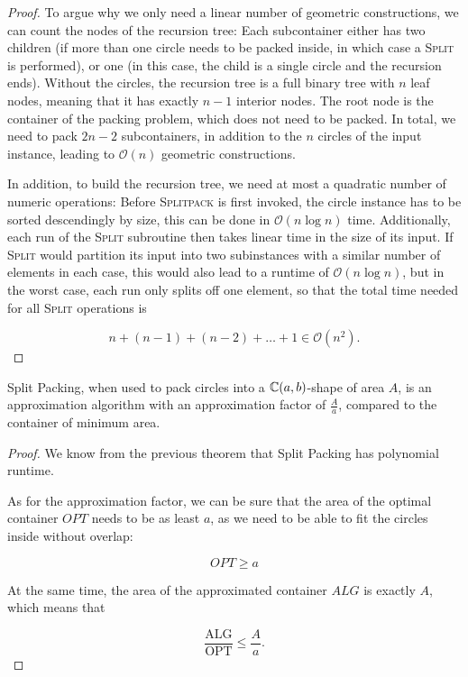 \documentclass[a4paper,style=print,bibliography=totoc,nexus,lnum,extramargin]{tubsbook}
\begin{document}
\begin{proof}
    To argue why we only need a linear number of geometric constructions, we can count the nodes of the recursion tree: Each subcontainer either has two children (if more than one circle needs to be packed inside, in which case a \textsc{Split} is performed), or one (in this case, the child is a single circle and the recursion ends). Without the circles, the recursion tree is a full binary tree with $n$ leaf nodes, meaning that it has exactly $n-1$ interior nodes. The root node is the container of the packing problem, which does not need to be packed. In total, we need to pack $2n-2$ subcontainers, in addition to the $n$ circles of the input instance, leading to $\mathcal{O}(n)$ geometric constructions.

    In addition, to build the recursion tree, we need at most a quadratic number of numeric operations:
    Before \textsc{Splitpack} is first invoked, the circle instance has to be sorted descendingly by size, this can be done in $\mathcal{O}(n \log n)$ time. Additionally, each run of the \textsc{Split} subroutine then takes linear time in the size of its input. If \textsc{Split} would partition its input into two subinstances with a similar number of elements in each case, this would also lead to a runtime of $\mathcal{O}(n \log n)$, but in the worst case, each run only splits off one element, so that the total time needed for all \textsc{Split} operations is

    $$n + (n-1) + (n-2) + \dots + 1 \in \mathcal{O}(n^2).$$
\end{proof}

\begin{theorem}
    Split Packing, when used to pack circles into a $\mathbb{C}(a,b)$-shape of area $A$, is an approximation algorithm with an approximation factor of $\frac{A}{a}$, compared to the container of minimum area.
\end{theorem}

\begin{proof}
    We know from the previous theorem that Split Packing has polynomial runtime.

    As for the approximation factor, we can be sure that the area of the optimal container $OPT$ needs to be as least $a$, as we need to be able to fit the circles inside without overlap:

    $$OPT \ge a$$

    At the same time, the area of the approximated container $ALG$ is exactly $A$, which means that

    $$\frac{\text{ALG}}{\text{OPT}} \le \frac{A}{a}.$$
\end{proof}
\end{document}
